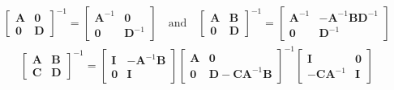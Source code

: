 \documentclass{article}
\newcommand{\mbf}[1]{{\boldsymbol{\mathbf{#1}}}}
\renewcommand{\bm}{\mbf}
\begin{document}
\begin{equation*}
    \begin{split}
      {\begin{bmatrix} \bm{A} & \bm{0} \\ \bm{0} & \bm{D} \end{bmatrix} }^{-1}
        =
        \begin{bmatrix} \bm{A}^{-1} & \bm{0} \\ \bm{0} & \bm{D}^{-1} \end{bmatrix}
          \quad \text{and} \quad
      {\begin{bmatrix} \bm{A} & \bm{B} \\ \bm{0} & \bm{D} \end{bmatrix}}^{-1} = {\begin{bmatrix} \bm{A}^{-1} & -\bm{A}^{-1}\bm{B}\bm{D}^{-1} \\ \bm{0} & \bm{D}^{-1}\end{bmatrix}}
    \end{split}
\end{equation*}
\begin{equation*}
    \begin{split}
{\begin{bmatrix} \bm{A} & \bm{B} \\ \bm{C} & \bm{D} \end{bmatrix}}^{-1}
  =
  {\begin{bmatrix} \bm{I} & -\bm{A}^{-1}\bm{B}\\ \bm{0} & \bm{I}\end{bmatrix}}
  {\begin{bmatrix} \bm{A} & \bm{0}\\ \bm{0} & \bm{D}-\bm{C}\bm{A}^{-1}\bm{B} \end{bmatrix}}^{-1}
  {\begin{bmatrix} \bm{I}& \bm{0}\\ -\bm{C}\bm{A}^{-1} & \bm{I} \end{bmatrix}}
    \end{split}
\end{equation*}
\end{document}
